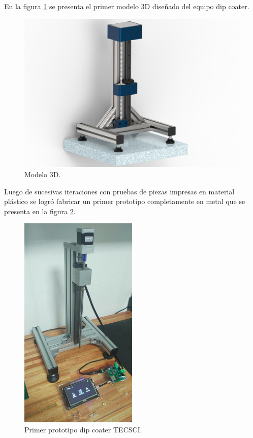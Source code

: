 En la figura \ref{fig:mecanica_3d_model} se presenta el primer modelo 3D diseñado del equipo dip coater.
\begin{figure}[h]
	\centering
	\includegraphics[width=1\textwidth]{./Figures/3d.jpg}
	\caption{Modelo 3D.}
	\label{fig:mecanica_3d_model}
\end{figure}



Luego de sucesivas iteraciones con pruebas de piezas impresas en material plástico se logró fabricar un primer prototipo completamente en metal que se presenta en la figura \ref{fig:mecanica_real_model}.

\begin{figure}[h]
	\centering
	\includegraphics[width=0.5\textwidth]{./Figures/real.png}
	\caption{Primer prototipo dip coater TECSCI.}
	\label{fig:mecanica_real_model}
\end{figure}

